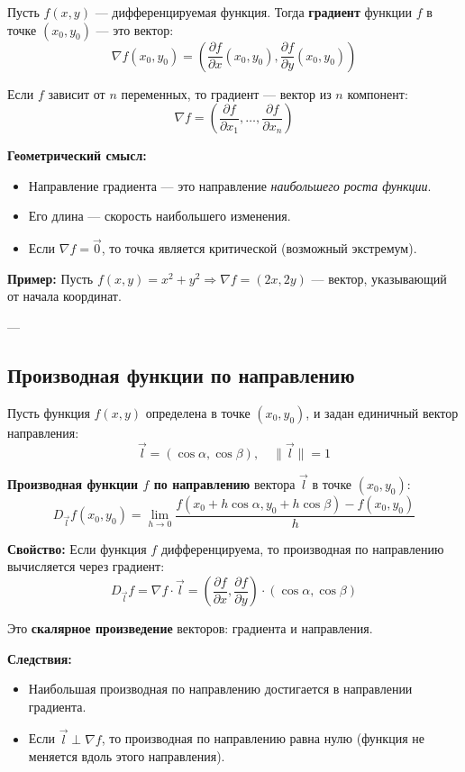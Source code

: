 Пусть $f(x, y)$ — дифференцируемая функция. Тогда \textbf{градиент} функции $f$ в точке $(x_0, y_0)$ — это вектор:
\[
\nabla f(x_0, y_0) = \left(
\frac{\partial f}{\partial x}(x_0, y_0),
\frac{\partial f}{\partial y}(x_0, y_0)
\right)
\]

Если $f$ зависит от $n$ переменных, то градиент — вектор из $n$ компонент:
\[
\nabla f = \left(
\frac{\partial f}{\partial x_1}, \dots, \frac{\partial f}{\partial x_n}
\right)
\]

\textbf{Геометрический смысл:}
\begin{itemize}
  \item Направление градиента — это направление \textit{наибольшего роста функции}.
  \item Его длина — скорость наибольшего изменения.
  \item Если $\nabla f = \vec{0}$, то точка является критической (возможный экстремум).
\end{itemize}

\textbf{Пример:}
Пусть $f(x, y) = x^2 + y^2 \Rightarrow \nabla f = (2x, 2y)$ — вектор, указывающий от начала координат.

---

\subsection*{Производная функции по направлению}

Пусть функция $f(x, y)$ определена в точке $(x_0, y_0)$, и задан единичный вектор направления:
\[
\vec{l} = (\cos \alpha, \cos \beta), \quad \|\vec{l}\| = 1
\]

\textbf{Производная функции $f$ по направлению} вектора $\vec{l}$ в точке $(x_0, y_0)$:
\[
D_{\vec{l}} f(x_0, y_0) = \lim_{h \to 0} \frac{f(x_0 + h \cos \alpha, y_0 + h \cos \beta) - f(x_0, y_0)}{h}
\]

\textbf{Свойство:}
Если функция $f$ дифференцируема, то производная по направлению вычисляется через градиент:
\[
D_{\vec{l}} f = \nabla f \cdot \vec{l} = \left(
\frac{\partial f}{\partial x}, \frac{\partial f}{\partial y}
\right) \cdot (\cos \alpha, \cos \beta)
\]

Это \textbf{скалярное произведение} векторов: градиента и направления.

\textbf{Следствия:}
\begin{itemize}
  \item Наибольшая производная по направлению достигается в направлении градиента.
  \item Если $\vec{l} \perp \nabla f$, то производная по направлению равна нулю (функция не меняется вдоль этого направления).
\end{itemize}

